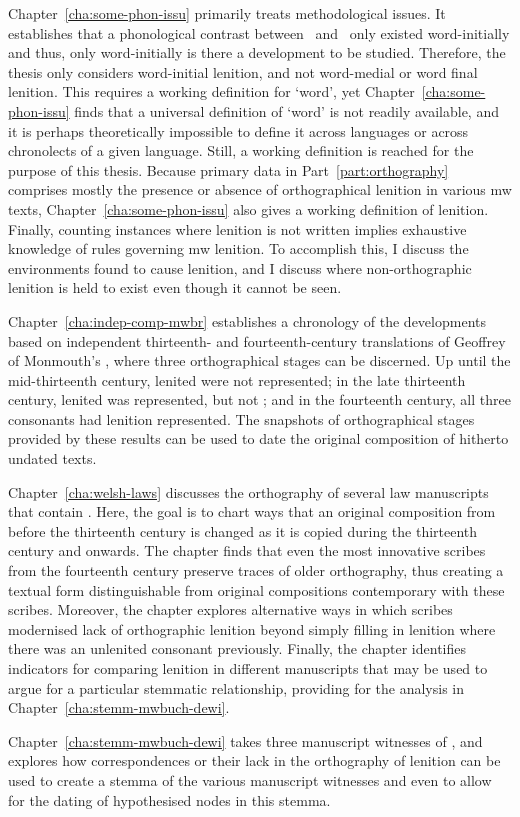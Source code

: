 Chapter~\ref{cha:some-phon-issu} primarily treats methodological issues. It establishes that a phonological contrast between \lT\ and \xD\ only existed word-initially and thus, only word-initially is there a development to be studied. Therefore, the thesis  only considers word-initial lenition, and not word-medial or word final lenition. This requires a working definition for `word', yet Chapter~\ref{cha:some-phon-issu} finds that a universal definition of `word' is not readily available, and it is perhaps theoretically impossible to define it across languages or across chronolects of a given language. Still, a working definition is reached for the purpose of this thesis. Because primary data in Part~\ref{part:orthography} comprises mostly the presence or absence of orthographical lenition in various \gls{mw} texts,  Chapter~\ref{cha:some-phon-issu} also gives a working definition of lenition. Finally, counting instances where lenition is not written implies exhaustive knowledge of rules governing \gls{mw} lenition. To accomplish this, I discuss the environments  found to cause lenition, and I discuss where non-orthographic lenition is held to exist even though it cannot be seen.

Chapter~\ref{cha:indep-comp-mwbr} establishes a chronology of the developments based on independent thirteenth- and fourteenth-century translations of Geoffrey of Monmouth's , where three orthographical stages can be discerned. Up until the mid-thirteenth century, lenited  were not represented; in the late thirteenth century, lenited  was represented, but not ; and in the fourteenth century, all three consonants had lenition represented. The snapshots of orthographical stages provided by these results can be used to date the original composition of hitherto undated texts.

Chapter~\ref{cha:welsh-laws} discusses the orthography of several law manuscripts that contain . Here, the goal is to chart ways that an original composition from before the  thirteenth century is changed as it is copied during the thirteenth century and onwards. The chapter finds that even the most innovative scribes from the fourteenth century preserve traces of older orthography, thus creating a textual form distinguishable from original compositions contemporary with these scribes. Moreover, the chapter explores  alternative ways in which scribes modernised lack of orthographic lenition beyond simply filling in lenition where there was an unlenited consonant previously. Finally, the chapter identifies indicators for comparing lenition in different manuscripts that may be used to argue for a particular stemmatic relationship, providing for the analysis in Chapter~\ref{cha:stemm-mwbuch-dewi}.

Chapter~\ref{cha:stemm-mwbuch-dewi} takes three manuscript witnesses of , and explores how correspondences or their lack in the orthography of lenition can be used to create a stemma of the various manuscript witnesses and even to allow for the dating of hypothesised nodes in this stemma. 


